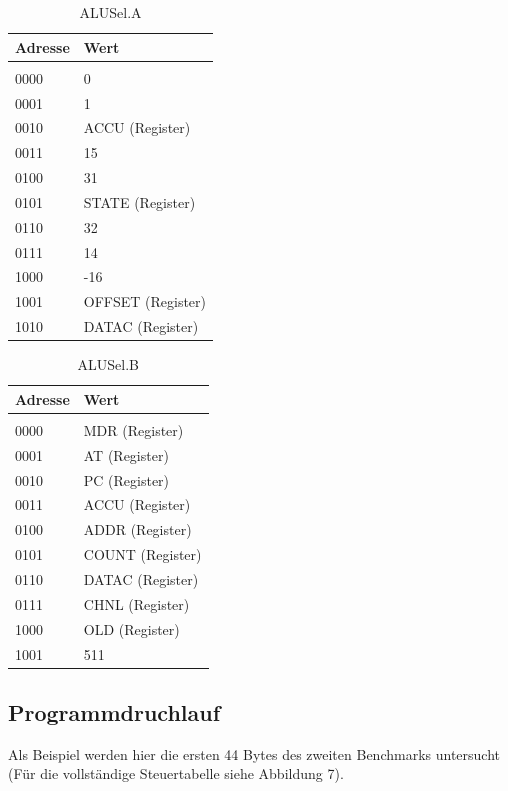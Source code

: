 \documentclass[12pt,titlepage]{article}
\begin{document}
\begin{table}[h!]
    \begin{tabular}{l|l}
    Adresse & Wert              \\
    \hline  					\\
    0000     & 0                 \\
    0001     & 1                 \\
    0010     & ACCU (Register)   \\
    0011     & 15                \\
    0100     & 31                \\
    0101     & STATE (Register)  \\
    0110     & 32                \\
    0111     & 14                \\
    1000     & -16               \\
    1001     & OFFSET (Register) \\
    1010     & DATAC (Register)  \\
    \end{tabular}
    \caption{ALUSel.A}
\end{table}

\begin{table}[h!]
    \begin{tabular}{l|l}
    Adresse & Wert            \\
    \hline                    \\
    0000     & MDR (Register)  \\
    0001     & AT (Register)   \\
    0010     & PC (Register)   \\
    0011     & ACCU (Register) \\
    0100     & ADDR (Register) \\
    0101     & COUNT (Register) \\
    0110     & DATAC (Register) \\
    0111     & CHNL (Register) \\
    1000     & OLD (Register)  \\
    1001     & 511             \\
    \end{tabular}
    \caption{ALUSel.B}
\end{table}

\newpage

\subsection{Programmdruchlauf}
Als Beispiel werden hier die ersten 44 Bytes des zweiten Benchmarks untersucht (Für die vollständige Steuertabelle siehe Abbildung 7).
\end{document}

